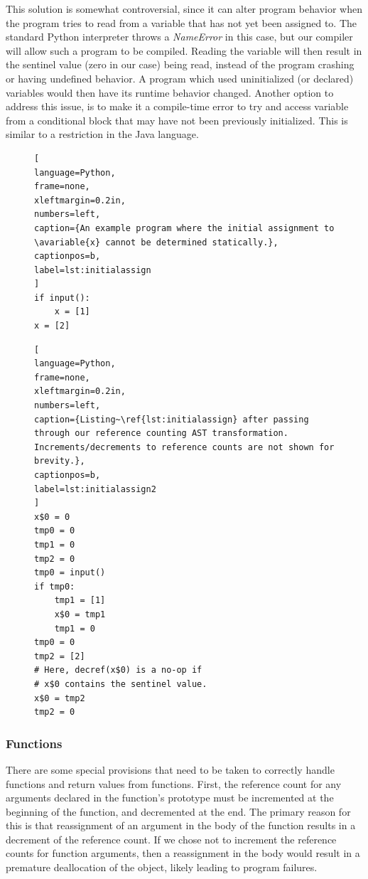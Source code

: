 \documentclass{sigplanconf}
\newcommand{\avariable}[1]{\ensuremath{#1}}
\begin{document}
This solution is somewhat controversial, since it can alter program behavior when the program tries to read from a variable that has not yet been assigned to.  The standard Python interpreter throws a \textit{NameError} in this case, but our compiler will allow such a program to be compiled.  Reading the variable will then result in the sentinel value (zero in our case) being read, instead of the program crashing or having undefined behavior.  A program which used uninitialized (or declared) variables would then have its runtime behavior changed.  Another option to address this issue, is to make it a compile-time error to try and access variable from a conditional block that may have not been previously initialized.  This is similar to a restriction in the Java language.

\begin{figure}[h]
\begin{lstlisting}[
language=Python,
frame=none,
xleftmargin=0.2in,
numbers=left,
caption={An example program where the initial assignment to \avariable{x} cannot be determined statically.},
captionpos=b,
label=lst:initialassign
]
if input():
    x = [1]
x = [2]
\end{lstlisting}
\end{figure}

\begin{figure}[h]
\begin{lstlisting}[
language=Python,
frame=none,
xleftmargin=0.2in,
numbers=left,
caption={Listing~\ref{lst:initialassign} after passing through our reference counting AST transformation. Increments/decrements to reference counts are not shown for brevity.},
captionpos=b,
label=lst:initialassign2
]
x$0 = 0
tmp0 = 0
tmp1 = 0
tmp2 = 0
tmp0 = input()
if tmp0:
    tmp1 = [1]
    x$0 = tmp1
    tmp1 = 0
tmp0 = 0
tmp2 = [2]
# Here, decref(x$0) is a no-op if 
# x$0 contains the sentinel value.
x$0 = tmp2 
tmp2 = 0
\end{lstlisting}
\end{figure}


\subsubsection{Functions}
There are some special provisions that need to be taken to correctly handle functions and return values from functions.  First, the reference count for any arguments declared in the function's prototype must be incremented at the beginning of the function, and decremented at the end.  The primary reason for this is that reassignment of an argument in the body of the function results in a decrement of the reference count.  If we chose not to increment the reference counts for function arguments, then a reassignment in the body would result in a premature deallocation of the object, likely leading to program failures.
\end{document}
